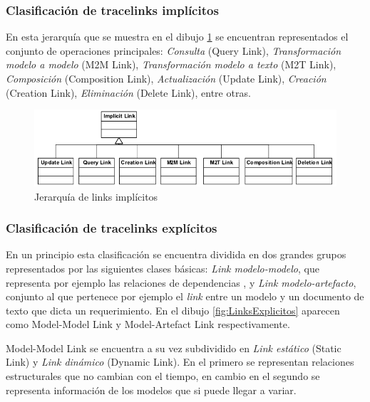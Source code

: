 \documentclass[a4paper,12pt,twoside,spanish,openright]{book}
\begin{document}
\subsubsection{Clasificación de tracelinks implícitos}


En esta jerarquía que se muestra en el dibujo \ref{fig:LinksImplicitos} se encuentran representados el conjunto de operaciones  principales: \textit{Consulta} (\textsf{Query Link}), \textit{Transformación modelo a modelo} (\textsf{M2M Link}), \textit{Transformación modelo a texto} (\textsf{M2T Link}), \textit{Composición} (\textsf{Composition Link}), \textit{Actualización} (\textsf{Update Link}), \textit{Creación} (\textsf{Creation Link}), \textit{Eliminación} (\textsf{Delete Link}), entre otras.


\begin{figure}[hbtp]
\centering
\includegraphics[scale=0.56]{./img/ImplicitTraceLinks}
\caption{Jerarquía de links implícitos}
\label{fig:LinksImplicitos}
\end{figure}


\subsubsection{Clasificación de tracelinks explícitos}

En un principio esta clasificación se encuentra dividida en dos grandes grupos representados por las siguientes clases básicas: \textit{Link modelo-modelo}, que representa por ejemplo las relaciones de dependencias , y \textit{Link modelo-artefacto}, conjunto al que pertenece por ejemplo el \textit{link} entre un modelo y un documento de texto que dicta un requerimiento. En el dibujo \ref{fig:LinksExplicitos} aparecen como \textsf{Model-Model Link} y \textsf{Model-Artefact Link} respectivamente.

\textsf{Model-Model Link} se encuentra a su vez subdividido en \textit{Link estático} (\textsf{Static Link}) y \textit{Link dinámico} (\textsf{Dynamic Link}). En el primero se representan relaciones estructurales que no cambian con el tiempo, en cambio en el segundo se representa información de los modelos que si puede llegar a variar.
\end{document}

